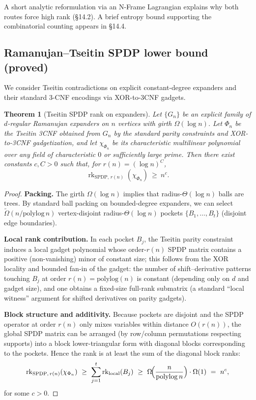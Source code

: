 \documentclass[12pt]{article}
\newtheorem{theorem}{Theorem}
\theoremstyle{definition}
\theoremstyle{definition}
\theoremstyle{remark}
\theoremstyle{remark}
\begin{document}
A short analytic reformulation via an N-Frame Lagrangian explains why both routes force high rank (\S14.2). A brief entropy bound supporting the combinatorial counting appears in \S14.4.

\subsection{Ramanujan--Tseitin SPDP lower bound (proved)}
\label{sec:np-identity-minor}

We consider Tseitin contradictions on explicit constant-degree expanders and their standard 3-CNF encodings via XOR-to-3CNF gadgets.

\begin{theorem}[Tseitin SPDP rank on expanders]\label{thm:tseitin-spdp-lb}
Let $\{G_n\}$ be an explicit family of $d$-regular Ramanujan expanders on $n$ vertices with girth $\Omega(\log n)$. Let $\Phi_n$ be the Tseitin 3CNF obtained from $G_n$ by the standard parity constraints and XOR-to-3CNF gadgetization, and let $\chi_{\Phi_n}$ be its characteristic multilinear polynomial over any field of characteristic $0$ or sufficiently large prime. Then there exist constants $c,C>0$ such that, for $r(n)=(\log n)^C$,
\[
\operatorname{rk}_{\mathrm{SPDP},\,r(n)}(\chi_{\Phi_n})\ \ge\ n^c.
\]
\end{theorem}

\begin{proof}
\textbf{Packing.} The girth $\Omega(\log n)$ implies that radius-$\Theta(\log n)$ balls are trees. By standard ball packing on bounded-degree expanders, we can select $\tilde\Omega(n/\mathrm{polylog}\,n)$ vertex-disjoint radius-$\Theta(\log n)$ pockets $\{B_1,\dots,B_t\}$ (disjoint edge boundaries).

\textbf{Local rank contribution.} In each pocket $B_j$, the Tseitin parity constraint induces a local gadget polynomial whose order-$r(n)$ SPDP matrix contains a positive (non-vanishing) minor of constant size; this follows from the XOR locality and bounded fan-in of the gadget: the number of shift--derivative patterns touching $B_j$ at order $r(n)=\mathrm{polylog}(n)$ is constant (depending only on $d$ and gadget size), and one obtains a fixed-size full-rank submatrix (a standard ``local witness'' argument for shifted derivatives on parity gadgets).

\textbf{Block structure and additivity.} Because pockets are disjoint and the SPDP operator at order $r(n)$ only mixes variables within distance $O(r(n))$, the global SPDP matrix can be arranged (by row/column permutations respecting supports) into a block lower-triangular form with diagonal blocks corresponding to the pockets. Hence the rank is at least the sum of the diagonal block ranks:
\[
\operatorname{rk}_{\mathrm{SPDP},\,r(n)}(\chi_{\Phi_n})\ \ge\ \sum_{j=1}^t \operatorname{rk}_{\mathrm{local}}(B_j)\ \ge\ \Omega\!\Bigl(\frac{n}{\mathrm{polylog}\,n}\Bigr)\cdot\Omega(1)\ =\ n^c,
\]
for some $c>0$.
\end{proof}
\end{document}
